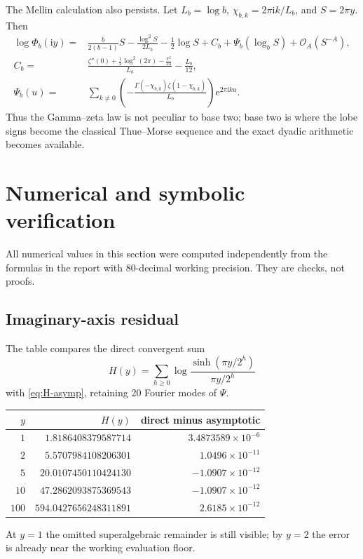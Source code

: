 \documentclass[11pt,oneside]{article}
\numberwithin{equation}{section}
\theoremstyle{definition}
\theoremstyle{remark}
\newcommand{\ii}{\mathrm i}
\newcommand{\e}{\mathrm e}
\newcommand{\bigO}{\mathcal O}
\begin{document}
The Mellin calculation also persists.  Let $L_b=\log b$,
$\chi_{b,k}=2\pi\ii k/L_b$, and $S=2\pi y$.  Then
\begin{align}
 \log\Phi_b(\ii y)
 ={}&\frac{b}{2(b-1)}S-\frac{\log^2S}{2L_b}-\frac12\log S+C_b
 +\Psi_b(\log_bS)+\bigO_A(S^{-A}),                        \label{eq:baseb-asymp}\\
 C_b={}&\frac{\zeta''(0)+\tfrac12\log^2(2\pi)-\tfrac{\pi^2}{24}}{L_b}
        -\frac{L_b}{12},                                  \label{eq:Cb}\\
 \Psi_b(u)={}&\sum_{k\ne0}
 \left(-\frac{\Gamma(-\chi_{b,k})\zeta(1-\chi_{b,k})}{L_b}\right)
 \e^{2\pi\ii ku}.                                        \label{eq:Psib}
\end{align}
Thus the Gamma--zeta law is not peculiar to base two; base two is where the lobe
signs become the classical Thue--Morse sequence and the exact dyadic arithmetic
becomes available.

\section{Numerical and symbolic verification}
\label{sec:numerics}

All numerical values in this section were computed independently from the
formulas in the report with 80-decimal working precision.  They are checks, not
proofs.

\subsection{Imaginary-axis residual}

The table compares the direct convergent sum
\begin{equation}
 H(y)=\sum_{h\ge0}\log\frac{\sinh(\pi y/2^h)}{\pi y/2^h}                  \label{eq:H-direct}
\end{equation}
with \eqref{eq:H-asymp}, retaining 20 Fourier modes of $\Psi$.
\begin{center}
\begin{tabular}{@{}r r r@{}}
\toprule
$y$ & $H(y)$ & direct minus asymptotic \\
\midrule
$1$   & $1.8186408379587714$   & $ 3.4873589\times10^{-6}$ \\
$2$   & $5.5707984108206301$   & $ 1.0496\times10^{-11}$ \\
$5$   & $20.0107450110424130$  & $-1.0907\times10^{-12}$ \\
$10$  & $47.2862093875369543$  & $-1.0907\times10^{-12}$ \\
$100$ & $594.0427656248311891$ & $ 2.6185\times10^{-12}$ \\
\bottomrule
\end{tabular}
\end{center}
At $y=1$ the omitted superalgebraic remainder is still visible; by $y=2$ the
error is already near the working evaluation floor.
\end{document}
